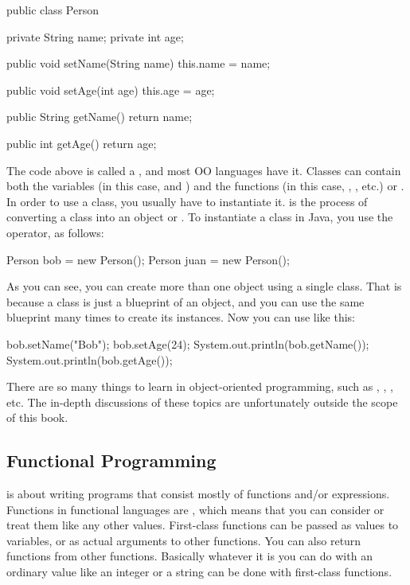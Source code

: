 \begin{Java}
public class Person {
	private String name;
	private int age;
	
	public void setName(String name) {
		this.name = name;		
	}
		
	public void setAge(int age) {
		this.age = age;		
	}
		
	public String getName() {
		return name;		
	}
		
	public int getAge() {
		return age;		
	}
}
\end{Java}

The code above is called a , and most OO languages have it. Classes can contain both the variables (in this case,  and ) and the functions (in this case, , , etc.) or . In order to use a class, you usually have to instantiate it.  is the process of converting a class into an object or . To instantiate a class in Java, you use the  operator, as follows:

\begin{Java}[3]
Person bob = new Person();
Person juan = new Person();
\end{Java}

As you can see, you can create more than one object using a single class. That is because a class is just a blueprint of an object, and you can use the same blueprint many times to create its instances. Now you can use  like this:

\begin{Java}[5]
bob.setName("Bob");
bob.setAge(24);
System.out.println(bob.getName());
System.out.println(bob.getAge());
\end{Java}

There are so many things to learn in object-oriented programming, such as , , , etc. The in-depth discussions of these topics are unfortunately outside the scope of this book.

\subsection{Functional Programming}
 is about writing programs that consist mostly of functions and/or expressions. Functions in functional languages are , which means that you can consider or treat them like any other values. First-class functions can be passed as values to variables, or as actual arguments to other functions. You can also return functions from other functions. Basically whatever it is you can do with an ordinary value like an integer  or a string  can be done with first-class functions.

